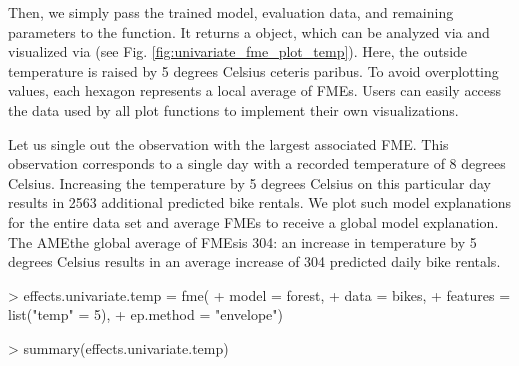 Then, we simply pass the trained model, evaluation data, and remaining parameters to the  function. 
It returns a  object, which can be analyzed via  and visualized via  (see Fig. \ref{fig:univariate_fme_plot_temp}). Here, the outside temperature is raised by 5 degrees Celsius ceteris paribus. To avoid overplotting values, each hexagon represents a local average of FMEs. Users can easily access the data used by all plot functions to implement their own visualizations.
\par
Let us single out the observation with the largest associated FME. This observation corresponds to a single day with a recorded temperature of 8 degrees Celsius. Increasing the temperature by 5 degrees Celsius on this particular day results in 2563 additional predicted bike rentals. We plot such model explanations for the entire data set and average FMEs to receive a global model explanation. The AME\textemdash the global average of FMEs\textemdash is 304: an increase in temperature by 5 degrees Celsius results in an average increase of 304 predicted daily bike rentals.

\begin{example}    
> effects.univariate.temp = fme(
+   model = forest,
+   data = bikes,
+   features = list("temp" = 5),
+   ep.method = "envelope")

> summary(effects.univariate.temp)
\end{example}

